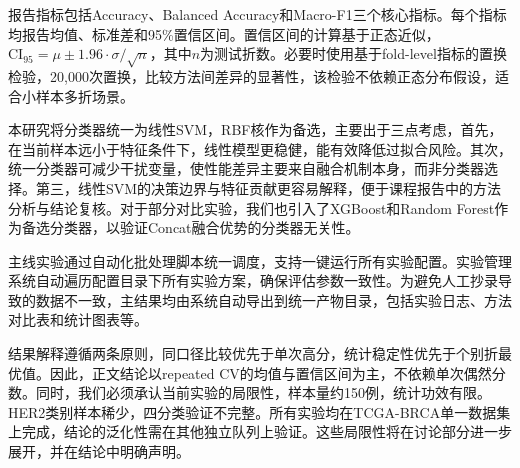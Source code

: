 报告指标包括Accuracy、Balanced Accuracy和Macro-F1三个核心指标。每个指标均报告均值、标准差和95\%置信区间。置信区间的计算基于正态近似，$\mathrm{CI}_{95} = \mu \pm 1.96 \cdot \sigma / \sqrt{n}$，其中$n$为测试折数。必要时使用基于fold-level指标的置换检验，20,000次置换，比较方法间差异的显著性，该检验不依赖正态分布假设，适合小样本多折场景。

本研究将分类器统一为线性SVM，RBF核作为备选，主要出于三点考虑，首先，在当前样本远小于特征条件下，线性模型更稳健，能有效降低过拟合风险。其次，统一分类器可减少干扰变量，使性能差异主要来自融合机制本身，而非分类器选择。第三，线性SVM的决策边界与特征贡献更容易解释，便于课程报告中的方法分析与结论复核。对于部分对比实验，我们也引入了XGBoost和Random Forest作为备选分类器，以验证Concat融合优势的分类器无关性。

主线实验通过自动化批处理脚本统一调度，支持一键运行所有实验配置。实验管理系统自动遍历配置目录下所有实验方案，确保评估参数一致性。为避免人工抄录导致的数据不一致，主结果均由系统自动导出到统一产物目录，包括实验日志、方法对比表和统计图表等。

结果解释遵循两条原则，同口径比较优先于单次高分，统计稳定性优先于个别折最优值。因此，正文结论以repeated CV的均值与置信区间为主，不依赖单次偶然分数。同时，我们必须承认当前实验的局限性，样本量约150例，统计功效有限。HER2类别样本稀少，四分类验证不完整。所有实验均在TCGA-BRCA单一数据集上完成，结论的泛化性需在其他独立队列上验证。这些局限性将在讨论部分进一步展开，并在结论中明确声明。

